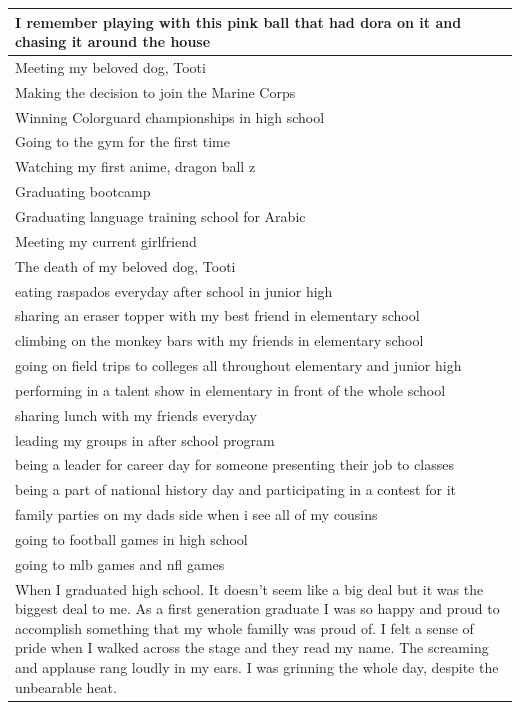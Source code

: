 \documentclass[
  .7em,
  letterpaper,
  DIV=11,
  numbers=noendperiod]{scrartcl}
\begin{document}
\begin{table}
\begin{tabular}{l}
\hline
I remember playing with this pink ball that had dora on it and chasing it around the house\\
\hline
Meeting my beloved dog, Tooti\\
\hline
Making the decision to join the Marine Corps\\
\hline
Winning Colorguard championships in high school\\
\hline
Going to the gym for the first time\\
\hline
Watching my first anime, dragon ball z\\
\hline
Graduating bootcamp\\
\hline
Graduating language training school for Arabic\\
\hline
Meeting my current girlfriend\\
\hline
The death of my beloved dog, Tooti\\
\hline
eating raspados everyday after school in junior high\\
\hline
sharing an eraser topper with my best friend in elementary school\\
\hline
climbing on the monkey bars with my friends in elementary school\\
\hline
going on field trips to colleges all throughout elementary and junior high\\
\hline
performing in a talent show in elementary in front of the whole school\\
\hline
sharing lunch with my friends everyday\\
\hline
leading my groups in after school program\\
\hline
being a leader for career day for someone presenting their job to classes\\
\hline
being a part of national history day and participating in a contest for it\\
\hline
family parties on my dads side when i see all of my cousins\\
\hline
going to football games in high school\\
\hline
going to mlb games and nfl games\\
\hline
When I graduated high school. It doesn't seem like a big deal but it was the biggest deal to me. As a first generation graduate I was so happy and proud to accomplish something that my whole familly was proud of. I felt a sense of pride when I walked across the stage and they read my name. The screaming and applause rang loudly in my ears. I was grinning the whole day, despite the unbearable heat.\\

\end{tabular}
\end{table}
\end{document}
